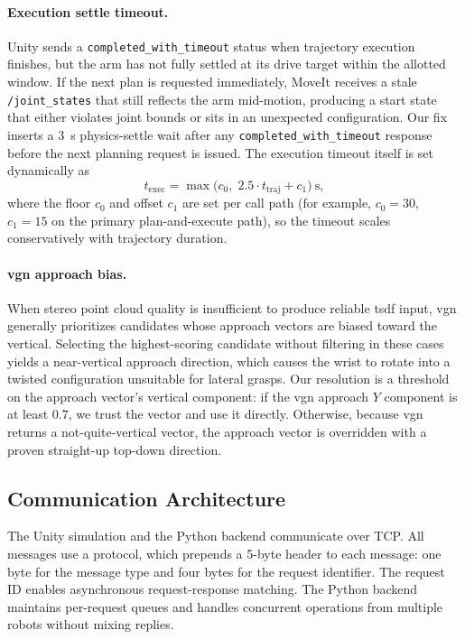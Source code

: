 \documentclass[
     12pt,
     a4paper,
     BCOR=10mm,
     DIV=14,
     listof=totoc,
     bibliography=totoc,
     parskip,
     twoside,
     headsepline
     ]{scrreprt}
\begin{document}
\paragraph{Execution settle timeout.}
Unity sends a \texttt{completed\_with\_timeout} status when trajectory execution finishes, but the arm has not fully settled at its drive target within the allotted window. If the next plan is requested immediately, MoveIt receives a stale \texttt{/joint\_states} that still reflects the arm mid-motion, producing a start state that either violates joint bounds or sits in an unexpected configuration. Our fix inserts a 3~s physics-settle wait after any \texttt{completed\_with\_timeout} response before the next planning request is issued. The execution timeout itself is set dynamically as
\begin{equation}
	t_{\mathrm{exec}} = \max\!\bigl(c_0,\; 2.5 \cdot t_{\mathrm{traj}} + c_1\bigr)~\text{s},
\end{equation}
where the floor $c_0$ and offset $c_1$ are set per call path (for example, $c_0 = 30$, $c_1 = 15$ on the primary plan-and-execute path), so the timeout scales conservatively with trajectory duration.

\paragraph{\gls{vgn} approach bias.}
When stereo point cloud quality is insufficient to produce reliable \gls{tsdf} input, \gls{vgn} generally prioritizes candidates whose approach vectors are biased toward the vertical. Selecting the highest-scoring candidate without filtering in these cases yields a near-vertical approach direction, which causes the wrist to rotate into a twisted configuration unsuitable for lateral grasps. Our resolution is a threshold on the approach vector's vertical component: if the \gls{vgn} approach $Y$ component is at least $0.7$, we trust the vector and use it directly. Otherwise, because \gls{vgn} returns a not-quite-vertical vector, the approach vector is overridden with a proven straight-up top-down direction.

\subsection{Communication Architecture}\label{sec:communication}
The Unity simulation and the Python backend communicate over TCP. All messages use a protocol, which prepends a 5-byte header to each message: one byte for the message type and four bytes for the request identifier. The request ID enables asynchronous request-response matching. The Python backend maintains per-request queues and handles concurrent operations from multiple robots without mixing replies.
\end{document}
